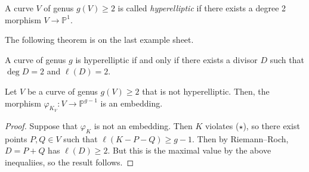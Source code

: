 \begin{definition}
    A curve \( V \) of genus \( g(V) \geq 2 \) is called \emph{hyperelliptic} if there exists a degree 2 morphism \( V \to \mathbb P^1 \).
\end{definition}
The following theorem is on the last example sheet.
\begin{theorem}
    A curve of genus \( g \) is hyperelliptic if and only if there exists a divisor \( D \) such that \( \deg D = 2 \) and \( \ell(D) = 2 \).
\end{theorem}
\begin{theorem}
    Let \( V \) be a curve of genus \( g(V) \geq 2 \) that is not hyperelliptic.
    Then, the morphism \( \varphi_{K_V} \colon V \to \mathbb P^{g-1} \) is an embedding.
\end{theorem}
\begin{proof}
    Suppose that \( \varphi_K \) is not an embedding.
    Then \( K \) violates (\( \star \)), so there exist points \( P, Q \in V \) such that \( \ell(K - P - Q) \geq g - 1 \).
    Then by Riemann--Roch, \( D = P + Q \) has \( \ell(D) \geq 2 \).
    But this is the maximal value by the above inequaliies, so the result follows.
\end{proof}
